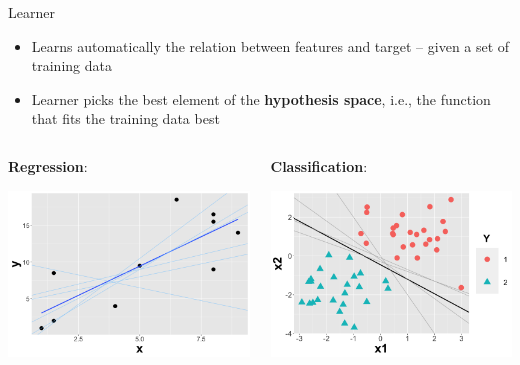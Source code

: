 \documentclass[11pt,compress,t,notes=noshow, xcolor=table]{beamer}
\begin{document}
\begin{vbframe}{Learner}

\begin{itemize}

\item Learns automatically the relation between features and target -- given a set of training data
\item Learner picks the best element of the \textbf{hypothesis space}, i.e., the function that fits the training data best
\end{itemize} \hspace{0.4cm}

\begin{columns}
\begin{column}{0.4\textwidth}
\textbf{Regression}:

  \begin{center}
    \includegraphics[width=\textwidth]{figure/nutshell-ml-basics-hypothesisspace-regr.png}
  \end{center}
\end{column}

\begin{column}{0.4\textwidth}
\textbf{Classification}:

  \begin{center}
    \includegraphics[width=\textwidth]{figure/nutshell-ml-basics-hypothesisspace-classif.png}
  \end{center}
\end{column}
\end{columns}


\end{vbframe}
\end{document}
